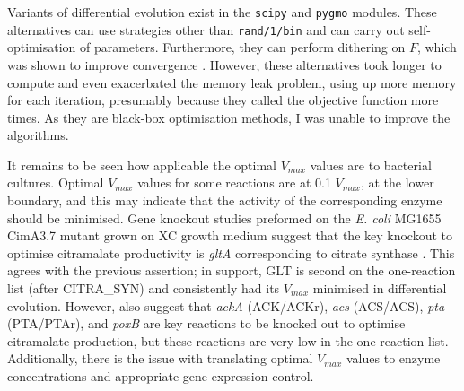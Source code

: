 \documentclass[parskip=full, numbers=noenddot]{scrreprt}
\begin{document}
Variants of differential evolution exist in the \texttt{scipy} and \texttt{pygmo} modules. These alternatives can use strategies other than \texttt{rand/1/bin} and can carry out self-optimisation of parameters. Furthermore, they can perform dithering on $F$, which was shown to improve convergence \citep{storn_usage_1996}. However, these alternatives took longer to compute and even exacerbated the memory leak problem, using up more memory for each iteration, presumably because they called the objective function more times. As they are black-box optimisation methods, I was unable to improve the algorithms.


It remains to be seen how applicable the optimal $V_{max}$ values are to bacterial cultures. Optimal $V_{max}$ values for some reactions are at 0.1 $V_{max}$, at the lower boundary, and this may indicate that the activity of the corresponding enzyme should be minimised. Gene knockout studies preformed on the \emph{E. coli} MG1655 CimA3.7 mutant grown on XC growth medium suggest that the key knockout to optimise citramalate productivity is \emph{gltA} corresponding to citrate synthase \citep{wu_production_2016}. This agrees with the previous assertion; in support, GLT is second on the one-reaction list (after CITRA\_SYN) and consistently had its $V_{max}$ minimised in differential evolution. However, \citet{wu_production_2016} also suggest that \emph{ackA} (ACK/ACKr), \emph{acs} (ACS/ACS), \emph{pta} (PTA/PTAr), and \emph{poxB} are key reactions to be knocked out to optimise citramalate production, but these reactions are very low in the one-reaction list.
Additionally, there is the issue with translating optimal $V_{max}$ values to enzyme concentrations and appropriate gene expression control. 


\end{document}
